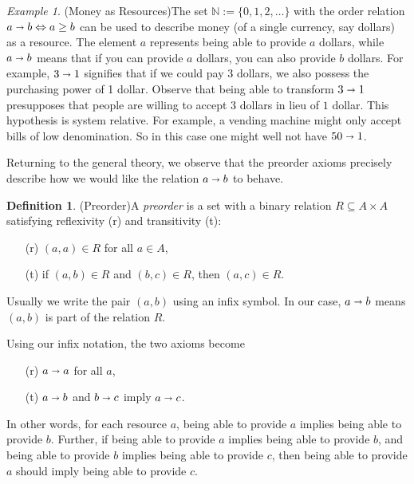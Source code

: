 \documentclass[12pt]{article}
\theoremstyle{definition}
\newtheorem{definition}{Definition}[section]
\theoremstyle{plain}
\theoremstyle{plain}
\theoremstyle{plain}
\theoremstyle{plain}
\theoremstyle{remark}
\newtheorem{example}{Example}[section]
\theoremstyle{remark}
\newcommand{\sub}{\subseteq}
\begin{document}
\begin{example}(Money as Resources)\label{ex:money}
	The set $\mathbb{N} := \{0,1,2,\ldots \}$ with the order relation $a \shortrightarrow b \Leftrightarrow a \geq b$ can be used to describe money (of a single currency, say dollars) as a resource. The element $a$ represents being able to provide $a$ dollars, while $a \shortrightarrow b$ means that if you can provide $a$ dollars, you can also provide $b$ dollars. For example, $3 \shortrightarrow 1$ signifies that if we could pay 3 dollars, we also possess the purchasing power of 1 dollar. Observe that being able to transform $3 \shortrightarrow 1$ presupposes that people are willing to accept $3$ dollars in lieu of $1$ dollar. This hypothesis is system relative. For example, a vending machine might only accept bills of low denomination. So in this case one might well not have $50 \shortrightarrow 1$.
\end{example}

Returning to the general theory, we observe that the preorder axioms precisely describe how we would like the relation $a \shortrightarrow b$ to behave.

\begin{definition}(Preorder)\label{def:preorder}
	A \emph{preorder} is a set with a binary relation $R \sub A \times A$ satisfying reflexivity (r) and transitivity (t):
	\begin{itemize}
		\item[(r)] $(a,a) \in R$ for all $a \in A$,
		\item[(t)] if $(a,b) \in R$ and $(b,c) \in R$, then $(a,c) \in R$.
	\end{itemize}
	Usually we write the pair $(a,b)$ using an infix symbol. In our case, $a \shortrightarrow b$ means $(a,b)$ is part of the relation $R$.
\end{definition}

Using our infix notation, the two axioms become 
\begin{itemize}
	\item[(r)] $a \shortrightarrow a$ for all $a$,
	\item[(t)] $a \shortrightarrow b$ and $b \shortrightarrow c$ imply $a \shortrightarrow c$.
\end{itemize}  
In other words, for each resource $a$, being able to provide $a$ implies being able to provide $b$. Further, if being able to provide $a$ implies being able to provide $b$, and being able to provide $b$ implies being able to provide $c$, then being able to provide $a$ should imply being able to provide $c$. \\
\end{document}
